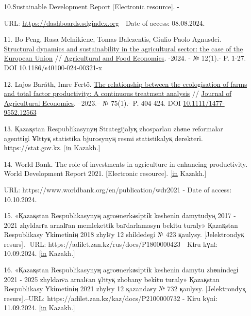 \begin{references}
10.Sustainable Development Report {[}Electronic resource{]}. -

URL: \url{https://dashboards.sdgindex.org} - Date of access: 08.08.2024.

11. Bo Peng, Rasa Melnikiene, Tomas Balezentis, Giulio Paolo Agnusdei.
\href{https://ideas.repec.org/a/spr/agfoec/v12y2024i1d10.1186_s40100-024-00321-x.html}{Structural
dynamics and sustainability in the agricultural sector: the case of the
European Union} //
\href{https://ideas.repec.org/s/spr/agfoec.html}{Agricultural and Food
Economics}. -2024. - № 12(1).- P. 1-27. DOI 10.1186/s40100-024-00321-x

12. Lajos Baráth, Imre Fertő.
\href{https://ideas.repec.org/a/bla/jageco/v75y2024i1p404-424.html}{The
relationship between the ecologisation of farms and total factor
productivity: A continuous treatment analysis} //
\href{https://ideas.repec.org/s/bla/jageco.html}{Journal of Agricultural
Economics}. --2023.-- № 75(1).- P. 404-424. DOI
\href{http://dx.doi.org/10.1111/1477-9552.12563}{10.1111/1477-9552.12563}

13. Қazaқstan Respublikasynyң Strategijalyқ zhosparlau zhәne reformalar
agenttіgі Ұlttyқ statistika bjurosynyң resmi statistikalyқ derekterі.
https://stat.gov.kz.
\href{https://kaz.zakon.kz/kogam-tynysy/6048484.\%20\%20\%20\%5bin}{{[}in}
Kazakh.{]}

14. World Bank. The role of investments in agriculture in enhancing
productivity. World Development Report 2021. {[}Electronic resource{]}.
\href{https://kaz.zakon.kz/kogam-tynysy/6048484.\%20\%20\%20\%5bin}{{[}in}
Kazakh.{]}

URL: https://www.worldbank.org/en/publication/wdr2021 - Date of access:
10.10.2024.

15. «Қazaқstan Respublikasynyң agroөnerkәsіptіk keshenіn damytudyң 2017
- 2021 zhyldarғa arnalғan memlekettіk baғdarlamasyn bekіtu turaly»
Қazaқstan Respublikasy Үkіmetіnің 2018 zhylғy 12 shіldedegі № 423
қaulysy. {[}Jelektrondyқ resurs{]}.- URL:
https://adilet.zan.kz/rus/docs/P1800000423 - Kіru kүnі: 10.09.2024.
\href{https://kaz.zakon.kz/kogam-tynysy/6048484.\%20\%20\%20\%5bin}{{[}in}
Kazakh.{]}

16. «Қazaқstan Respublikasynyң agroөnerkәsіptіk keshenіn damytu
zhөnіndegі 2021 - 2025 zhyldarғa arnalғan ұlttyқ zhobany bekіtu turaly»
Қazaқstan Respublikasy Үkіmetіnің 2021 zhylғy 12 қazandaғy № 732
қaulysy. {[}Jelektrondyқ resurs{]}.--URL:
https://adilet.zan.kz/kaz/docs/P2100000732 - Kіru kүnі: 11.09.2024.
\href{https://kaz.zakon.kz/kogam-tynysy/6048484.\%20\%20\%20\%5bin}{{[}in}
Kazakh.{]}


\end{references}
